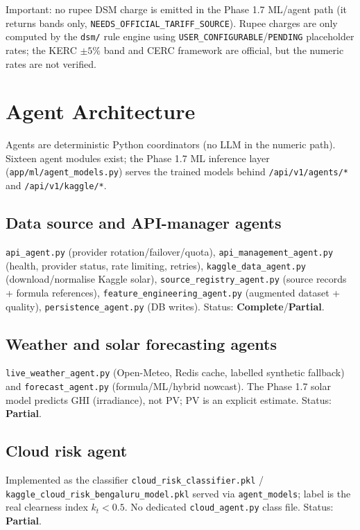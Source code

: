\documentclass[11pt,a4paper]{article}
\newcommand{\stC}{\textcolor{cok}{\textbf{Complete}}}
\newcommand{\stP}{\textcolor{cpart}{\textbf{Partial}}}
\newcommand{\code}[1]{\texttt{\small #1}}
\begin{document}
\noindent Important: no rupee DSM charge is emitted in the Phase 1.7 ML/agent path (it
returns bands only, \code{NEEDS\_OFFICIAL\_TARIFF\_SOURCE}). Rupee charges are only computed
by the \code{dsm/} rule engine using \code{USER\_CONFIGURABLE}/\code{PENDING} placeholder
rates; the KERC $\pm5\%$ band and CERC framework are official, but the numeric rates are not
verified.

\section{Agent Architecture}
Agents are deterministic Python coordinators (no LLM in the numeric path). Sixteen agent
modules exist; the Phase 1.7 ML inference layer (\code{app/ml/agent\_models.py}) serves the
trained models behind \code{/api/v1/agents/*} and \code{/api/v1/kaggle/*}.

\subsection{Data source and API-manager agents}
\code{api\_agent.py} (provider rotation/failover/quota), \code{api\_management\_agent.py}
(health, provider status, rate limiting, retries), \code{kaggle\_data\_agent.py}
(download/normalise Kaggle solar), \code{source\_registry\_agent.py} (source records +
formula references), \code{feature\_engineering\_agent.py} (augmented dataset + quality),
\code{persistence\_agent.py} (DB writes). Status: \stC/\stP.

\subsection{Weather and solar forecasting agents}
\code{live\_weather\_agent.py} (Open-Meteo, Redis cache, labelled synthetic fallback) and
\code{forecast\_agent.py} (formula/ML/hybrid nowcast). The Phase 1.7 solar model predicts
GHI (irradiance), not PV; PV is an explicit estimate. Status: \stP.

\subsection{Cloud risk agent}
Implemented as the classifier \code{cloud\_risk\_classifier.pkl} /
\code{kaggle\_cloud\_risk\_bengaluru\_model.pkl} served via \code{agent\_models}; label is
the real clearness index $k_t<0.5$. No dedicated \code{cloud\_agent.py} class file. Status:
\stP.
\end{document}
